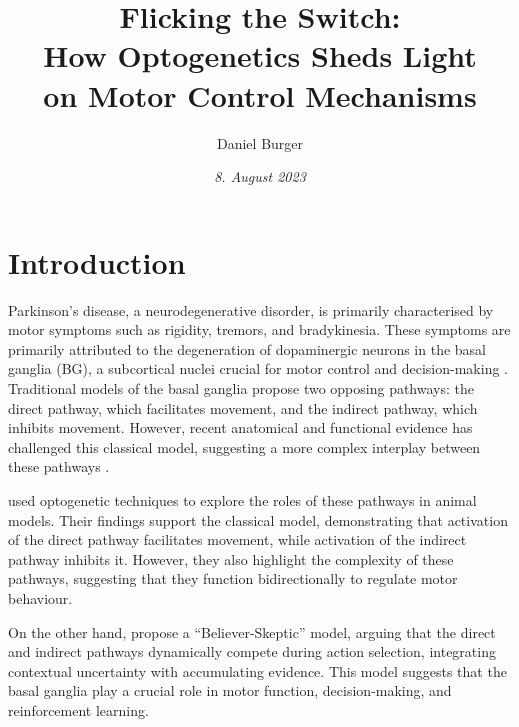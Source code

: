 \documentclass[10pt]{article}
\title{\textbf{Flicking the Switch: } \\ How Optogenetics Sheds Light \\ on Motor Control Mechanisms}
\author[ ]{Daniel Burger}
\affil[ ]{\textbf{King’s College London}}
\affil[ ]{\href{mailto:public@danielburger.online}{public@danielburger.online}}
\date{\textit{8. August 2023}}
\begin{document}


\begin{sloppypar} %





  \doublespacing

  \section{Introduction}
  \label{sec:introduction}
  Parkinson’s disease, a neurodegenerative disorder, is primarily characterised by motor symptoms such as rigidity, tremors, and bradykinesia. These symptoms are primarily attributed to the degeneration of dopaminergic neurons in the basal ganglia (BG), a subcortical nuclei crucial for motor control and decision-making \citep {kravitz_regulation_2010}. Traditional models of the basal ganglia propose two opposing pathways: the direct pathway, which facilitates movement, and the indirect pathway, which inhibits movement. However, recent anatomical and functional evidence has challenged this classical model, suggesting a more complex interplay between these pathways \citep {dunovan_believer-skeptic_2016}.

  \cite {kravitz_regulation_2010} used optogenetic techniques to explore the roles of these pathways in animal models. Their findings support the classical model, demonstrating that activation of the direct pathway facilitates movement, while activation of the indirect pathway inhibits it. However, they also highlight the complexity of these pathways, suggesting that they function bidirectionally to regulate motor behaviour.

  On the other hand, \cite {dunovan_believer-skeptic_2016} propose a “Believer-Skeptic” model, arguing that the direct and indirect pathways dynamically compete during action selection, integrating contextual uncertainty with accumulating evidence. This model suggests that the basal ganglia play a crucial role in motor function, decision-making, and reinforcement learning.


\end{sloppypar}
\end{document}
